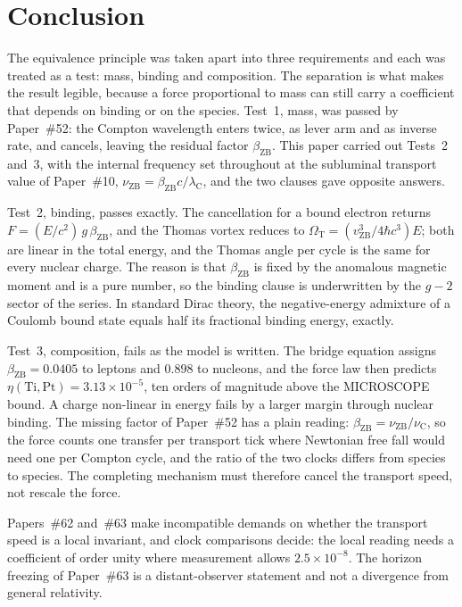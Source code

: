 \documentclass[%
 reprint, amsmath,amssymb, aps, prb, ]{revtex4-2}
\numberwithin{equation}{section}
\newcommand{\vZB}{v_{\text{ZB}}}
\newcommand{\betaZB}{\beta_{\text{ZB}}}
\newcommand{\lambdaC}{\lambda_{\text{C}}}
\newcommand{\nuZB}{\nu_{\text{ZB}}}
\newcommand{\nuC}{\nu_{\text{C}}}
\newcommand{\OmT}{\Omega_{\text{T}}}
\begin{document}
\section{Conclusion}
\label{sec:conclusion}

The equivalence principle was taken apart into three requirements and each was treated as a test: mass, binding and composition. The separation is what makes the result legible, because a force proportional to mass can still carry a coefficient that depends on binding or on the species. Test~1, mass, was passed by Paper~\#52: the Compton wavelength enters twice, as lever arm and as inverse rate, and cancels, leaving the residual factor $\betaZB$. This paper carried out Tests~2 and~3, with the internal frequency set throughout at the subluminal transport value of Paper~\#10, $\nuZB = \betaZB c/\lambdaC$, and the two clauses gave opposite answers.

Test~2, binding, passes exactly. The cancellation for a bound electron returns $F = (E/c^{2})\,g\,\betaZB$, and the Thomas vortex reduces to $\OmT = (\vZB^{3}/4\hbar c^{3})E$; both are linear in the total energy, and the Thomas angle per cycle is the same for every nuclear charge. The reason is that $\betaZB$ is fixed by the anomalous magnetic moment and is a pure number, so the binding clause is underwritten by the $g-2$ sector of the series. In standard Dirac theory, the negative-energy admixture of a Coulomb bound state equals half its fractional binding energy, exactly.

Test~3, composition, fails as the model is written. The bridge equation assigns $\betaZB = 0.0405$ to leptons and $0.898$ to nucleons, and the force law then predicts $\eta(\mathrm{Ti},\mathrm{Pt}) = 3.13\times10^{-5}$, ten orders of magnitude above the MICROSCOPE bound. A charge non-linear in energy fails by a larger margin through nuclear binding. The missing factor of Paper~\#52 has a plain reading: $\betaZB = \nuZB/\nuC$, so the force counts one transfer per transport tick where Newtonian free fall would need one per Compton cycle, and the ratio of the two clocks differs from species to species. The completing mechanism must therefore cancel the transport speed, not rescale the force.

Papers~\#62 and~\#63 make incompatible demands on whether the transport speed is a local invariant, and clock comparisons decide: the local reading needs a coefficient of order unity where measurement allows $2.5\times10^{-8}$. The horizon freezing of Paper~\#63 is a distant-observer statement and not a divergence from general relativity.
\end{document}
